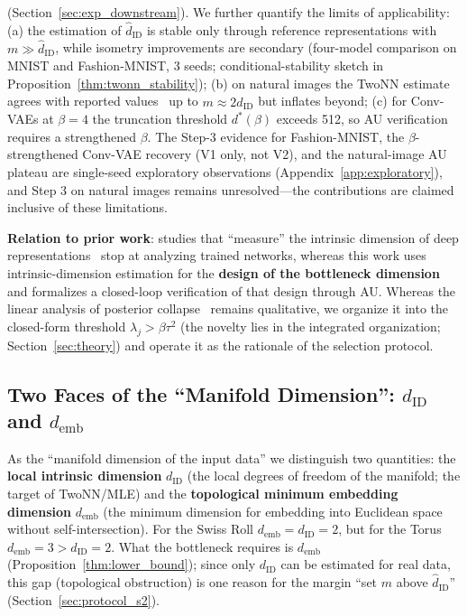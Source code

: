 \documentclass[make,article,submit,pdftex,moreauthors]{Definitions/mdpi}
\newcommand{\dID}{d_{\mathrm{ID}}}
\newcommand{\hatdID}{\hat{d}_{\mathrm{ID}}}
\newcommand{\demb}{d_{\mathrm{emb}}}
\newcommand{\dstar}{d^{*}(\beta)}
\begin{document}
\begin{enumerate}
        (Section~\ref{sec:exp_downstream}).
        We further quantify the limits of applicability:
        (a) the estimation of $\hatdID$ is stable only through reference
        representations with $m \gg \hatdID$, while isometry improvements
        are secondary (four-model comparison on MNIST and Fashion-MNIST,
        3 seeds; conditional-stability sketch in
        Proposition~\ref{thm:twonn_stability});
        (b) on natural images the TwoNN estimate agrees with reported
        values~\cite{pope2021intrinsic} up to $m \approx 2\hatdID$ but
        inflates beyond;
        (c) for Conv-VAEs at $\beta = 4$ the truncation threshold $\dstar$
        exceeds 512, so AU verification requires a strengthened $\beta$.
        The Step-3 evidence for Fashion-MNIST, the $\beta$-strengthened
        Conv-VAE recovery (V1 only, not V2), and the natural-image AU
        plateau are single-seed
        exploratory observations (Appendix~\ref{app:exploratory}), and
        Step 3 on natural images remains unresolved---the contributions are
        claimed inclusive of these limitations.
\end{enumerate}

\textbf{Relation to prior work}:
studies that ``measure'' the intrinsic dimension of deep
representations~\cite{ansuini2019intrinsic,pope2021intrinsic,valeriani2023geometry}
stop at analyzing trained networks, whereas this work uses
intrinsic-dimension estimation for the \textbf{design of the bottleneck
dimension} and formalizes a closed-loop verification of that design through
AU.
Whereas the linear analysis of posterior collapse~\cite{lucas2019elbo}
remains qualitative, we organize it into the closed-form threshold
$\lambda_j > \beta\tau^2$ (the novelty lies in the integrated organization;
Section~\ref{sec:theory}) and operate it as the rationale of the selection
protocol.

\subsection{Two Faces of the ``Manifold Dimension'': $\dID$ and $\demb$}\label{sec:intro_dim}

As the ``manifold dimension of the input data'' we distinguish two
quantities:
the \textbf{local intrinsic dimension} $\dID$ (the local degrees of freedom
of the manifold; the target of TwoNN/MLE) and the
\textbf{topological minimum embedding dimension} $\demb$ (the minimum
dimension for embedding into Euclidean space without self-intersection).
For the Swiss Roll $\demb = \dID = 2$, but for the Torus
$\demb = 3 > \dID = 2$.
What the bottleneck requires is $\demb$
(Proposition~\ref{thm:lower_bound}); since only $\dID$ can be estimated for
real data, this gap (topological obstruction) is one reason for the margin
``set $m$ above $\hatdID$'' (Section~\ref{sec:protocol_s2}).
\end{document}
